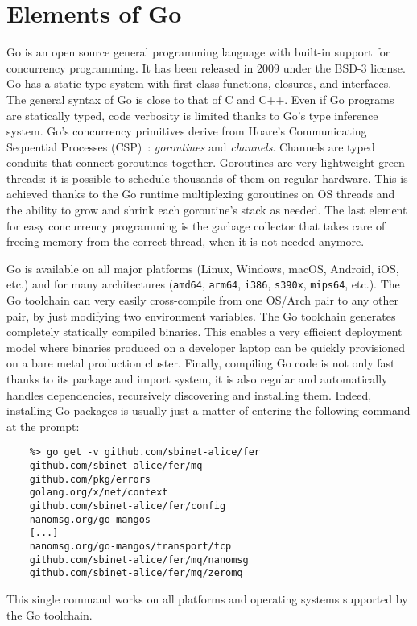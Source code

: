 \documentclass{webofc}
\begin{document}
\section{Elements of Go}
\label{sec-intro-go}
Go is an open source general programming language with built-in support for concurrency programming.
It has been released in 2009 under the BSD-3 license.
Go has a static type system with first-class functions, closures, and interfaces.
The general syntax of Go is close to that of C and C++.
Even if Go programs are statically typed, code verbosity is limited thanks to Go's type inference system.
Go's concurrency primitives derive from Hoare's Communicating Sequential Processes (CSP)~\cite{ref-csp}: \emph{goroutines} and \emph{channels}.
Channels are typed conduits that connect goroutines together.
Goroutines are very lightweight green threads: it is possible to schedule thousands of them on regular hardware.
This is achieved thanks to the Go runtime multiplexing goroutines on OS threads and the ability to grow and shrink each goroutine's stack as needed.
The last element for easy concurrency programming is the garbage collector that takes care of freeing memory from the correct thread, when it is not needed anymore.

Go is available on all major platforms (Linux, Windows, macOS, Android, iOS, etc.) and for many architectures (\texttt{amd64}, \texttt{arm64}, \texttt{i386}, \texttt{s390x}, \texttt{mips64}, etc.).
The Go toolchain can very easily cross-compile from one OS/Arch pair to any other pair, by just modifying two environment variables.
The Go toolchain generates completely statically compiled binaries.
This enables a very efficient deployment model where binaries produced on a developer laptop can be quickly provisioned on a bare metal production cluster.
Finally, compiling Go code is not only fast thanks to its package and import system, it is also regular and automatically handles dependencies, recursively discovering and installing them.
Indeed, installing Go packages is usually just a matter of entering the following command at the prompt:
\begin{verbatim}
	%> go get -v github.com/sbinet-alice/fer
	github.com/sbinet-alice/fer/mq
	github.com/pkg/errors
	golang.org/x/net/context
	github.com/sbinet-alice/fer/config
	nanomsg.org/go-mangos
	[...]
	nanomsg.org/go-mangos/transport/tcp
	github.com/sbinet-alice/fer/mq/nanomsg
	github.com/sbinet-alice/fer/mq/zeromq
\end{verbatim}
This single command works on all platforms and operating systems supported by the Go toolchain.
\end{document}
